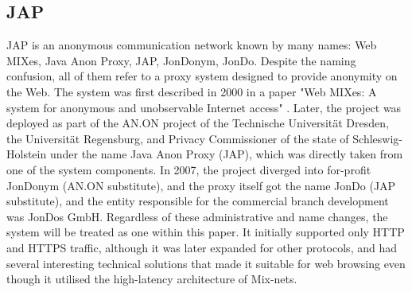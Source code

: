\subsection{JAP}
JAP is an anonymous communication network known by many names: Web MIXes, Java Anon Proxy, JAP, JonDonym, JonDo. Despite the naming confusion, all of them refer to a proxy system designed to provide anonymity on the Web. The system was first described in 2000 in a paper "Web MIXes: A system for anonymous and unobservable Internet access" \cite{web-mixes}. Later, the project was deployed as part of the AN.ON project of the Technische Universität Dresden, the Universität Regensburg, and Privacy Commissioner of the state of Schleswig-Holstein under the name Java Anon Proxy (JAP), which was directly taken from one of the system components. In 2007, the project diverged into for-profit JonDonym (AN.ON substitute), and the proxy itself got the name JonDo (JAP substitute), and the entity responsible for the commercial branch development was JonDos GmbH. Regardless of these administrative and name changes, the system will be treated as one within this paper. It initially supported only HTTP and HTTPS traffic, although it was later expanded for other protocols, and had several interesting technical solutions that made it suitable for web browsing even though it utilised the high-latency architecture of Mix-nets.

